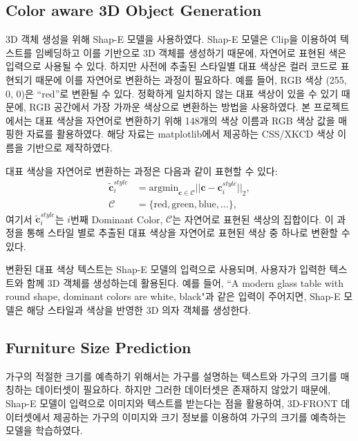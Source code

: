 \documentclass[11pt]{article}
\begin{document}
\subsection{Color aware 3D Object Generation}
3D 객체 생성을 위해 Shap-E\cite{jun2023shapegeneratingconditional3d} 모델을 사용하였다.
Shap-E 모델은 Clip\cite{pmlr-v139-radford21a}을 이용하여 텍스트를 임베딩하고 이를 기반으로 3D 객체를 생성하기 때문에, 자연어로 표현된 색은 입력으로 사용될 수 있다.
하지만 사전에 추출된 스타일별 대표 색상은 컬러 코드로 표현되기 때문에 이를 자연어로 변환하는 과정이 필요하다. 예를 들어, RGB 색상 (255, 0, 0)은 ``red''로 변환될 수 있다.
정확하게 일치하지 않는 대표 색상이 있을 수 있기 때문에, RGB 공간에서 가장 가까운 색상으로 변환하는 방법을 사용하였다.
본 프로젝트에서는 대표 색상을 자연어로 변환하기 위해 148개의 색상 이름과 RGB 색상 값을 매핑한 자료를 활용하였다.
해당 자료는 matplotlib에서 제공하는 CSS/XKCD 색상 이름을 기반으로 제작하였다.

대표 색상을 자연어로 변환하는 과정은 다음과 같이 표현할 수 있다:
\begin{equation}
    \label{eq:color_to_text}
    \begin{aligned}
        \mathbf{\tilde{c}}^{style}_i & = \text{argmin}_{\mathbf{c} \in \mathcal{C}} ||\mathbf{c} - \mathbf{c}^{style}_i||_2 , \\
        \mathcal{C}                & = \{ \text{red}, \text{green}, \text{blue}, \ldots \} ,
    \end{aligned}
\end{equation}
여기서 $\mathbf{\tilde{c}}^{style}_i$는 $i$번째 Dominant Color, $\mathcal{C}$는 자연어로 표현된 색상의 집합이다. 이 과정을 통해 스타일 별로 추출된 대표 색상을 자연어로 표현된 색상 중 하나로 변환할 수 있다.

변환된 대표 색상 텍스트는 Shap-E 모델의 입력으로 사용되며, 사용자가 입력한 텍스트와 함께 3D 객체를 생성하는데 활용된다. 예를 들어, ``A modern glass table with round shape, dominant colors are white, black"과 같은 입력이 주어지면, Shap-E 모델은 해당 스타일과 색상을 반영한 3D 의자 객체를 생성한다.

\subsection{Furniture Size Prediction}
가구의 적절한 크기를 예측하기 위해서는 가구를 설명하는 텍스트와 가구의 크기를 매칭하는 데이터셋이 필요하다.
하지만 그러한 데이터셋은 존재하지 않았기 때문에, Shap-E 모델이 입력으로 이미지와 텍스트를 받는다는 점을 활용하여, 3D-FRONT 데이터셋에서 제공하는 가구의 이미지와 크기 정보를 이용하여 가구의 크기를 예측하는 모델을 학습하였다.
\end{document}
